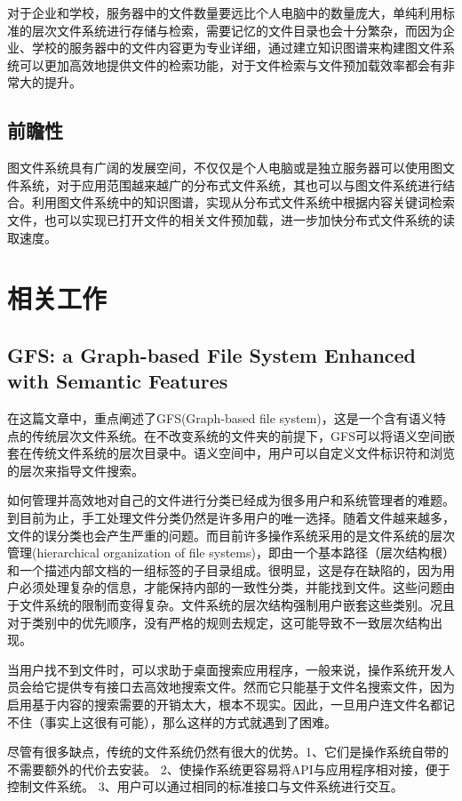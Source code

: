 \documentclass[UTF8]{ctexart}
\begin{document}
对于企业和学校，服务器中的文件数量要远比个人电脑中的数量庞大，单纯利用标准的层次文件系统进行存储与检索，需要记忆的文件目录也会十分繁杂，而因为企业、学校的服务器中的文件内容更为专业详细，通过建立知识图谱来构建图文件系统可以更加高效地提供文件的检索功能，对于文件检索与文件预加载效率都会有非常大的提升。

\subsection{前瞻性}
图文件系统具有广阔的发展空间，不仅仅是个人电脑或是独立服务器可以使用图文件系统，对于应用范围越来越广的分布式文件系统，其也可以与图文件系统进行结合。利用图文件系统中的知识图谱，实现从分布式文件系统中根据内容关键词检索文件，也可以实现已打开文件的相关文件预加载，进一步加快分布式文件系统的读取速度。

\section{相关工作}
\subsection{GFS: a Graph-based File System Enhanced with Semantic Features}
在这篇文章中，重点阐述了GFS(Graph-based file system)，这是一个含有语义特点的传统层次文件系统。在不改变系统的文件夹的前提下，GFS可以将语义空间嵌套在传统文件系统的层次目录中。语义空间中，用户可以自定义文件标识符和浏览的层次来指导文件搜索。

如何管理并高效地对自己的文件进行分类已经成为很多用户和系统管理者的难题。到目前为止，手工处理文件分类仍然是许多用户的唯一选择。随着文件越来越多，文件的误分类也会产生严重的问题。而目前许多操作系统采用的是文件系统的层次管理(hierarchical organization of file systems)，即由一个基本路径（层次结构根）和一个描述内部文档的一组标签的子目录组成。很明显，这是存在缺陷的，因为用户必须处理复杂的信息，才能保持内部的一致性分类，并能找到文件。这些问题由于文件系统的限制而变得复杂。文件系统的层次结构强制用户嵌套这些类别。况且对于类别中的优先顺序，没有严格的规则去规定，这可能导致不一致层次结构出现。

当用户找不到文件时，可以求助于桌面搜索应用程序，一般来说，操作系统开发人员会给它提供专有接口去高效地搜索文件。然而它只能基于文件名搜索文件，因为启用基于内容的搜索需要的开销太大，根本不现实。因此，一旦用户连文件名都记不住（事实上这很有可能），那么这样的方式就遇到了困难。

尽管有很多缺点，传统的文件系统仍然有很大的优势。1、它们是操作系统自带的不需要额外的代价去安装。 2、使操作系统更容易将API与应用程序相对接，便于控制文件系统。 3、用户可以通过相同的标准接口与文件系统进行交互。
\end{document}
